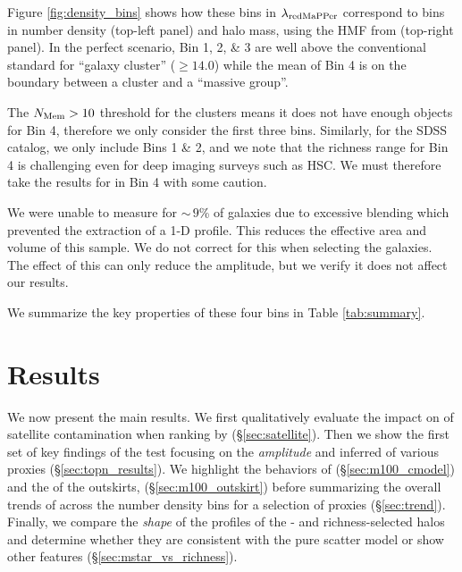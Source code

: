 \documentclass[fleqn,usenatbib,useAMS,english]{mnras}
\begin{document}
    Figure \ref{fig:density_bins} shows how these bins in $\lambda_{\rm redMaPPer}$ correspond to
    bins in number density (top-left panel) and halo mass, using the HMF from 
    (top-right panel).
    In the perfect scenario, Bin 1, 2, \& 3 are well above the conventional standard for
    ``galaxy cluster'' (\logmvir{}$\geq 14.0$) while the mean \mvir{} of Bin 4 is on the boundary
    between a cluster and a ``massive group''.

    The $N_{\rm Mem} > 10$ threshold for the \camira{} clusters means it does not have enough
    objects for Bin 4, therefore we only consider the first three bins.
    Similarly, for the SDSS \redm{} catalog, we only include Bins 1 \& 2, and we note that the
    richness range for Bin 4 is challenging even for deep imaging surveys such as HSC.
    We must therefore take the results for \redm{} in Bin 4 with some caution.

    We were unable to measure \mstar{} for $\sim\,9$\% of galaxies due to excessive blending which
    prevented the extraction of a 1-D profile. This reduces the effective area and volume of this sample.
    We do not correct for this when selecting the \topn{} galaxies. The effect of this can
    only reduce the \dsigma{} amplitude, but we verify it does not affect our results.

    We summarize the key properties of these four bins in Table \ref{tab:summary}.




\section{Results}
    \label{sec:result}

    We now present the main results.
    We first qualitatively evaluate the impact on \dsigma{} of satellite contamination when ranking
    by \mstar{} (\S \ref{sec:satellite}).
    Then we show the first set of key findings of the \topn{} test focusing on the {\em amplitude}
    and inferred \sigmh{} of various \mvir{} proxies (\S \ref{sec:topn_results}).
    We highlight the behaviors of \mcmodel{} (\S \ref{sec:m100_cmodel}) and the \mstar{} of the
    outskirts,  (\S \ref{sec:m100_outskirt})
    before summarizing the overall trends of \sigmh{} across the number density bins for a selection
    of \mvir{} proxies (\S \ref{sec:trend}).
    Finally, we compare the {\em shape} of the \dsigma{} profiles of the \mstar{}- and richness-selected
    halos and determine whether they are consistent with the pure scatter model or show other
    features (\S \ref{sec:mstar_vs_richness}).
\end{document}
